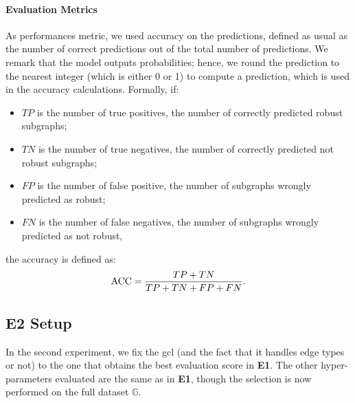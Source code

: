 \paragraph{Evaluation Metrics} As performances metric, we used accuracy on the predictions, defined as usual as the number of correct predictions out of the total number of predictions. We remark that the model outputs probabilities; hence, we round the prediction to the nearest integer (which is either 0 or 1) to compute a  prediction, which is used in the accuracy calculations. Formally, if: \begin{itemize}
    \item $TP$ is the number of true positives, \ie the number of correctly predicted robust subgraphs;
    \item $TN$ is the number of true negatives, \ie the number of correctly predicted not robust subgraphs;
    \item $FP$ is the number of false positive, \ie the number of subgraphs wrongly predicted as robust;
    \item $FN$ is the number of false negatives, \ie the number of subgraphs wrongly predicted as not robust,
\end{itemize}
the accuracy is defined as:
$$ \mathrm{ACC} = \frac{TP + TN}{TP + TN + FP + FN}.$$

\subsection{E2 Setup}
In the second experiment, we fix the \gls{gcl} (and the fact that it handles edge types or not) to the one that obtains the best evaluation score in \textbf{E1}.
The other hyper-parameters evaluated are the same as in \textbf{E1}, though the selection is now performed on the full dataset $\mathbb{G}$.

